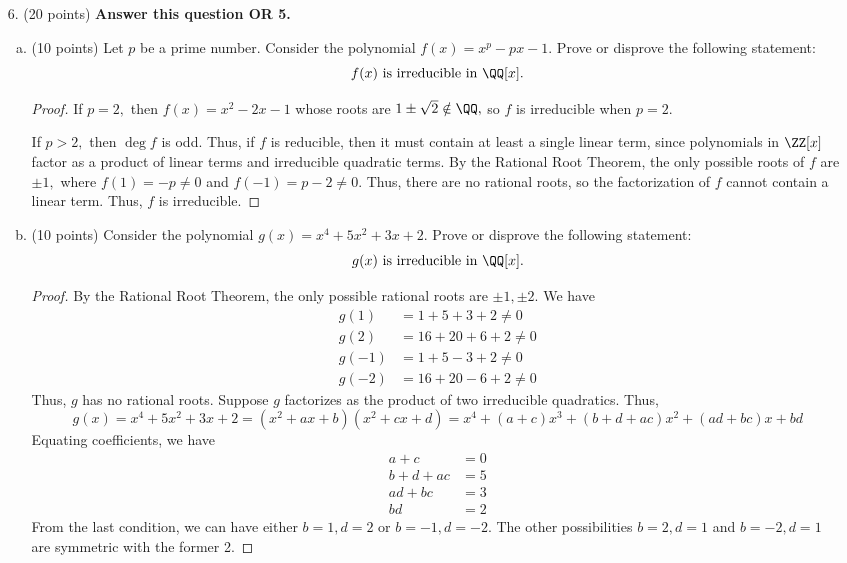 \documentclass{article}
\begin{document}
\begin{itemize}
\begin{enumerate}[(a)]
		\end{enumerate}

		\newpage

	\item[6.] (20 points) \textbf{Answer this question OR 5.}
		\begin{enumerate}[(a)]
			\item (10 points) Let $p$ be a prime number. Consider the polynomial $f(x)=x^p-px-1.$ Prove or disprove the following statement:
				\[f(x)\text{ is irreducible in }\QQ[x].\]
				\begin{proof}
					If $p=2,$ then $f(x)=x^2-2x-1$ whose roots are $1\pm \sqrt{2}\notin \QQ,$ so $f$ is irreducible when $p=2.$ 

					If $p>2,$ then $\deg f$ is odd. Thus, if $f$ is reducible, then it must contain at least a single linear term, since polynomials in $\ZZ[x]$ factor as a product of linear terms and irreducible quadratic terms. By the Rational Root Theorem, the only possible roots of $f$ are $\pm 1,$ where $f(1)=-p\neq 0$ and $f(-1)=p-2\neq 0.$ Thus, there are no rational roots, so the factorization of $f$ cannot contain a linear term. Thus, $f$ is irreducible.
				\end{proof}

			\item (10 points) Consider the polynomial $g(x)=x^4+5x^2+3x+2.$ Prove or disprove the following statement:
				\[g(x)\text{ is irreducible in }\QQ[x].\]
				\begin{proof}
					By the Rational Root Theorem, the only possible rational roots are $\pm 1, \pm 2.$ We have
					\begin{align*}
						g(1) &= 1+5+3+2\neq 0 \\
						g(2) &= 16+20+6+2\neq 0 \\
						g(-1) &= 1+5-3+2\neq 0 \\
						g(-2) &= 16+20-6+2\neq 0
					\end{align*}
					Thus, $g$ has no rational roots. Suppose $g$ factorizes as the product of two irreducible quadratics. Thus, 
					\[g(x)=x^4+5x^2+3x+2=(x^2+ax+b)(x^2+cx+d)=x^4+(a+c)x^3+(b+d+ac)x^2+(ad+bc)x+bd\]
					Equating coefficients, we have
					\begin{align*}
						a+c &= 0 \\
						b+d+ac &= 5 \\
						ad+bc &= 3 \\
						bd &= 2
					\end{align*}
					From the last condition, we can have either $b=1, d=2$ or $b=-1, d=-2.$ The other possibilities $b=2, d=1$ and $b=-2, d=1$ are symmetric with the former 2.


\end{proof}
\end{enumerate}
\end{itemize}
\end{document}
